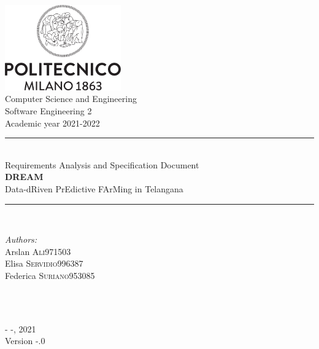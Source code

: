 \documentclass[a4paper,11pt]{report}
\begin{document}
\begin{titlepage}

\newcommand{\HRule}{\rule{\linewidth}{0.1mm}}

\center 

\includegraphics[width=50mm,scale=0.5]{./Images/Logo_Politecnico_Milano.png}\\[0.5cm] 

{\Large Computer Science and Engineering}\\[0.4cm] 
{\large Software Engineering 2}\\[0.4cm] 
{\large Academic year 2021-2022}\\[0.5cm] 

\HRule \\[1.5 cm]
{\LARGE Requirements Analysis and Specification Document} \\[1cm]
{\textbf {\Huge DREAM}}\\[0.3cm] 
{\LARGE Data-dRiven PrEdictive FArMing in Telangana} \\[1cm]
\HRule \\[1.5cm]
\raggedright

\begin{minipage}{0.55\textwidth}
\begin{flushleft} \large
\emph{Authors:}\\
Arslan \textsc{Ali}\hfill 971503 \\
Elisa \textsc{Servidio}\hfill 996387 \\
Federica \textsc{Suriano}\hfill 953085 \\
\end{flushleft}
\end{minipage}\\[1 cm]
~

\center

{\large - -, 2021}\\[0.3 cm]
{\large Version -.0}\\

\vfill 
\end{titlepage}

\newpage

\tableofcontents
{}
\listoftables
\newpage
\listoffigures
\newpage







\end{document}
